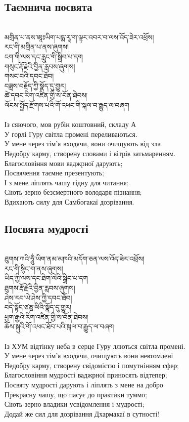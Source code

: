 \subsection{Таємнича посвята}
\\
\ti
མགྲིན་པ་ནས་ཨཱཿཡིག་པདྨ་རཱ་ག་ལྟར་འབར་བ་ལས་འོད་ཟེར་འཕྲོས།\\
རང་གི་མགྲིན་པ་ནས་ཞུགས།\\
ངག་གི་ལས་དང་རླུང་གི་སྒྲིབ་པ་དག\\
གསུང་རྡོ་རྗེའི་བྱིན་རླབས་ཞུགས།\\
གསང་བའི་དབང་ཐོབ།\\
བཟླས་བརྗོད་ཀྱི་སྣོད་དུ་གྱུར།\\
ཚེ་དབང་རིག་འཛིན་གྱི་ས་བོན་ཐེབས།\\
ལོངས་སྤྱོད་རྫོགས་པའི་གོ་འཕང་གི་སྐལ་བ་རྒྱུད་ལ་བཞག\\
\\
\ru
Із сяючого, мов рубін коштовний, складу А\\
У горлі Гуру світла промені переливаються.\\
У мене через тім'я входячи, вони очищують від зла\\
Недобру карму, створену словами і вітрів затьмаренням.\\
Благословіння мови ваджрної дарують;\\
Посвячення таємне презентують;\\
І з мене ліплять чашу гідну для читання;\\
Сіють зерно безсмертного володаря пізнання;\\
Вдихають силу для Самбогакаї дозрівання. \\

\newpage
\subsection{Посвята мудрості}
\\
\ti
ཐུགས་ཀའི་ཧཱུྂ་ཡིག་ནམ་མཁའི་མདོག་ཅན་ལས་འོད་ཟེར་འཕྲོས།\\
རང་གི་སྙིང་ག་ནས་ཞུགས།\\
ཡིད་ཀྱི་ལས་དང་ཐིག་ལེའི་སྒྲིབ་པ་དག\\
ཐུགས་རྡོ་རྗེའི་བྱིན་རླབས་ཞུགས།\\
ཤེས་རབ་ཡེ་ཤེས་ཀྱི་དབང་ཐོབ།\\
བདེ་སྟོང་ཙཎྜ་ལིའི་སྣོད་དུ་གྱུར།\\
ཕྱག་རྒྱའི་རིག་འཛིན་གྱི་ས་བོན་ཐེབས།\\
ཆོས་སྐུའི་གོ་འཕང་ཐོབ་པའི་སྐལ་བ་རྒྱུད་ལ་བཞག\\
\\
\ru
Із ХУМ відтінку неба в серце Гуру ллються світла промені.\\
У мене через тім'я входячи, очищують вони невтомлені\\
Недобру карму, створену свідомістю і помутнінням сфер;\\
Благословіння мудрості ваджрної приносять відтепер;\\
Посвяту мудрості дарують і ліплять з мене на добро\\
Прекрасну чашу, що пасує до практики туммо;\\
Сіють зерно владики усвідомлення і мудрості;\\
Додай же сил для дозрівання Дхармакаї в сутності!\\

